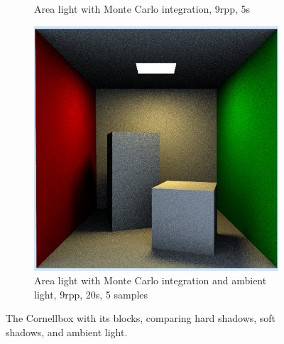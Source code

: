\begin{figure}[h]
\begin{subfigure}[b]{0.4\textwidth}
		\caption{Area light with Monte Carlo integration, 9rpp, 5s}
	\end{subfigure}
	\begin{subfigure}[b]{0.4\textwidth}
		\includegraphics[width=\textwidth]{week4/cornellblocks_ambient_9rpp_20s.png}
		\caption{Area light with Monte Carlo integration and ambient light, 9rpp, 20s, 5 samples}
	\end{subfigure}
	\caption{The Cornellbox with its blocks, comparing hard shadows, soft shadows, and ambient light.}
	\label{fig:comparehardsoftambient}
 \end{figure}
 
